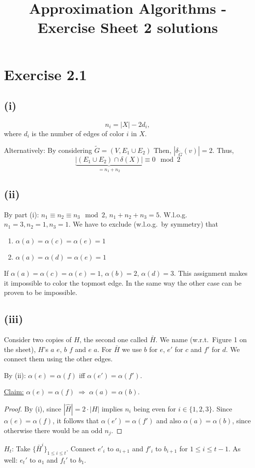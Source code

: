 \documentclass[oneside,a4paper]{amsart}
\begin{document}
\title{Approximation Algorithms - Exercise Sheet 2 solutions}
\maketitle{}
\section*{Exercise 2.1}
\subsection*{(i)}
\[
	n_i = |X| - 2 d_i,
\]
where $d_i$ is the number of edges of color $i$ in $X$.

Alternatively: By considering $\tilde{G} = (V, E_1 \cup E_2)$ Then, $|\delta_{\tilde{G}}(v)| = 2$. Thus,
\[
	\underbrace{ |(E_1 \cup E_2) \cap \delta(X)| }_{= n_1 + n_2} \equiv 0 \mod 2
\]
\subsection*{(ii)}
By part (i): $n_1 \equiv n_2 \equiv n_3 \mod 2$, $n_1 + n_2 + n_3 = 5$.
W.l.o.g.~$n_1 = 3, n_2 = 1, n_3 = 1$.
We have to exclude (w.l.o.g.~by symmetry) that
\begin{enumerate}
\item $\alpha(a) = \alpha(c) = \alpha(e) = 1$
\item $\alpha(a) = \alpha(d) = \alpha(e) = 1$
\end{enumerate}
If $\alpha(a) = \alpha(c) = \alpha(e) = 1$, $\alpha(b) = 2$, $\alpha(d) = 3$. This assignment makes it impossible to color the topmost edge. In the same way the other case can be proven to be impossible.
\subsection*{(iii)}
Consider two copies of $H$, the second one called $\bar{H}$. We name (w.r.t.~Figure 1 on the sheet), $H$'s $a$ $e$, $b$ $f$ and $e$ $a$. For $\bar{H}$ we use $b$ for $e$, $e'$ for $c$ and $f'$ for $d$. We connect them using the other edges.

By (ii): $\alpha(e) = \alpha(f)$ iff $\alpha(e') = \alpha(f')$.

\underline{Claim:} $\alpha(e) = \alpha(f) \; \Rightarrow \; \alpha(a) = \alpha(b)$.
\begin{proof}
By (i), since $|\hat{H}| = 2 \cdot |H|$ implies $n_i$ being even for $i \in \{ 1, 2, 3\}$.
Since $\alpha(e) = \alpha(f)$, it follows that $\alpha(e') = \alpha(f')$ and also $\alpha(a) = \alpha(b)$, since otherwise there would be an odd $n_j$.
\end{proof}
$H_t$: Take $\{ \bar{H}^i \}_{1 \leq i \leq t}$.
Connect $e'_i$ to $a_{i+1}$ and $f'_i$ to $b_{i+1}$ for $1 \leq i \leq t - 1$.
As well: $e_t'$ to $a_1$ and $f_t'$ to $b_1$.
\end{document}
